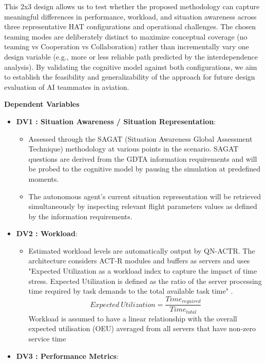\documentclass[12pt,a4paper]{article} %
\begin{document}
	This 2x3 design allows us to test whether the proposed methodology can capture meaningful differences in performance, workload, and situation awareness across three representative HAT configurations and operational challenges. The chosen teaming modes are deliberately distinct to maximize conceptual coverage (no teaming vs Cooperation vs Collaboration) rather than incrementally vary one design variable (e.g., more or less reliable path predicted by the interdependence analysis). By validating the cognitive model against both configurations, we aim to establish the feasibility and generalizability of the approach for future design evaluation of AI teammates in aviation.

	\textbf{Dependent Variables}
	\begin{itemize}
		\item \textbf{DV1 : Situation Awareness / Situation Representation}:
		\begin{itemize}
			\item Assessed through the SAGAT (Situation Awareness Global Assessment Technique) methodology at various points in the scenario.
			SAGAT questions are derived from the GDTA information requirements and will be probed to the cognitive model by pausing the simulation at predefined moments.
			\item The autonomous agent's current situation representation will be retrieved simultaneously by inspecting relevant flight parameters values as defined by the information requirements.
		\end{itemize}
		\item \textbf{DV2 : Workload}:
		\begin{itemize}
			\item Estimated workload levels are automatically output by QN-ACTR. The architecture considers ACT-R modules and buffers as servers and uses "Expected Utilization as a workload index to capture the impact of time stress. Expected Utilization is defined as the ratio of the server processing time required by task demands to the total available task time" \parencite{cao_modelling_2015}.
			\begin{equation}
				Expected\ Utilization = \frac{Time_{required}}{Time_{total}} 
			\end{equation}
			Workload is assumed to have a linear relationship with the overall expected utilisation (OEU) averaged from all servers that have non-zero service time
		\end{itemize}
		\item \textbf{DV3 : Performance Metrics}:

\end{itemize}
\end{document}
